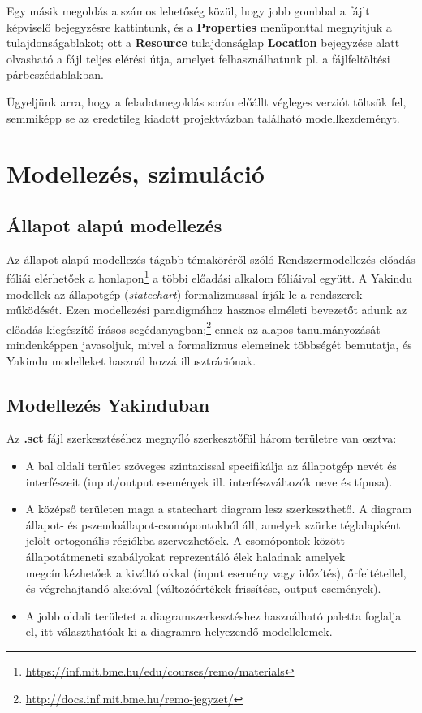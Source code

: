 Egy másik megoldás a számos lehetőség közül, hogy jobb gombbal a fájlt képviselő bejegyzésre kattintunk, és a \textbf{Properties} menüponttal megnyitjuk a tulajdonságablakot; ott a \textbf{Resource} tulajdonságlap \textbf{Location} bejegyzése alatt olvasható a fájl teljes elérési útja, amelyet felhasználhatunk pl. a fájlfeltöltési párbeszédablakban.

Ügyeljünk arra, hogy a feladatmegoldás során előállt végleges verziót töltsük fel, semmiképp se az eredetileg kiadott projektvázban található modellkezdeményt.


\section{Modellezés, szimuláció}

\subsection{Állapot alapú modellezés}

Az állapot alapú modellezés tágabb témaköréről szóló Rendszermodellezés előadás fóliái elérhetőek a honlapon\footnote{\url{https://inf.mit.bme.hu/edu/courses/remo/materials}} a többi előadási alkalom fóliáival együtt. A Yakindu modellek az állapotgép (\emph{statechart}) formalizmussal írják le a rendszerek működését. Ezen modellezési paradigmához hasznos elméleti bevezetőt adunk az előadás kiegészítő írásos segédanyagban;\footnote{\url{http://docs.inf.mit.bme.hu/remo-jegyzet/}} ennek az alapos tanulmányozását mindenképpen javasoljuk, mivel a formalizmus elemeinek többségét bemutatja, és Yakindu modelleket használ hozzá illusztrációnak.

\subsection{Modellezés Yakinduban}

Az \textbf{.sct} fájl szerkesztéséhez megnyíló szerkesztőfül három területre van osztva:

\begin{itemize}
	\item A bal oldali terület szöveges szintaxissal specifikálja az állapotgép nevét és interfészeit (input/output események ill. interfészváltozók neve és típusa).
	\item A középső területen maga a statechart diagram lesz szerkeszthető. A diagram állapot- és pszeudoállapot-csomópontokból áll, amelyek szürke téglalapként jelölt ortogonális régiókba szervezhetőek. A csomópontok között állapotátmeneti szabályokat reprezentáló élek haladnak amelyek megcímkézhetőek a kiváltó okkal (input esemény vagy időzítés), őrfeltétellel, és végrehajtandó akcióval (változóértékek frissítése, output események).
	\item A jobb oldali területet a diagramszerkesztéshez használható paletta foglalja el, itt választhatóak ki a diagramra helyezendő modellelemek.
\end{itemize}

